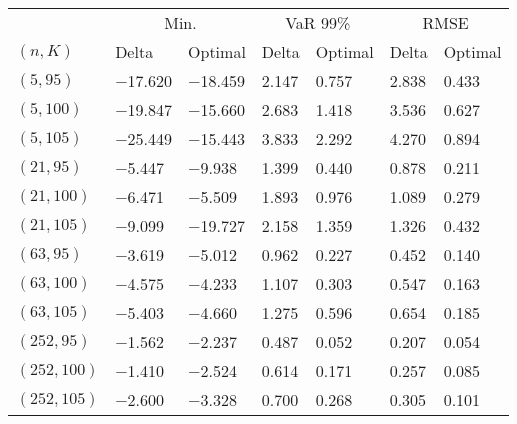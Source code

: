 \begin{tabular}{lllllll}
\toprule
& \multicolumn{2}{c}{Min.} & \multicolumn{2}{c}{VaR 99\%} & \multicolumn{2}{c}{RMSE}\\
$(n,K)$& Delta & Optimal & Delta & Optimal & Delta & Optimal\\
\midrule
$(5,95)$ & \num{-17.620} & \num{-18.459} & \num{2.147} & \num{0.757} & \num{2.838} & \num{0.433}\\
$(5,100)$ & \num{-19.847} & \num{-15.660} & \num{2.683} & \num{1.418} & \num{3.536} & \num{0.627}\\
$(5,105)$ & \num{-25.449} & \num{-15.443} & \num{3.833} & \num{2.292} & \num{4.270} & \num{0.894}\\
$(21,95)$ & \num{-5.447} & \num{-9.938} & \num{1.399} & \num{0.440} & \num{0.878} & \num{0.211}\\
$(21,100)$ & \num{-6.471} & \num{-5.509} & \num{1.893} & \num{0.976} & \num{1.089} & \num{0.279}\\
$(21,105)$ & \num{-9.099} & \num{-19.727} & \num{2.158} & \num{1.359} & \num{1.326} & \num{0.432}\\
$(63,95)$ & \num{-3.619} & \num{-5.012} & \num{0.962} & \num{0.227} & \num{0.452} & \num{0.140}\\
$(63,100)$ & \num{-4.575} & \num{-4.233} & \num{1.107} & \num{0.303} & \num{0.547} & \num{0.163}\\
$(63,105)$ & \num{-5.403} & \num{-4.660} & \num{1.275} & \num{0.596} & \num{0.654} & \num{0.185}\\
$(252,95)$ & \num{-1.562} & \num{-2.237} & \num{0.487} & \num{0.052} & \num{0.207} & \num{0.054}\\
$(252,100)$ & \num{-1.410} & \num{-2.524} & \num{0.614} & \num{0.171} & \num{0.257} & \num{0.085}\\
$(252,105)$ & \num{-2.600} & \num{-3.328} & \num{0.700} & \num{0.268} & \num{0.305} & \num{0.101}\\
\bottomrule
\end{tabular}
